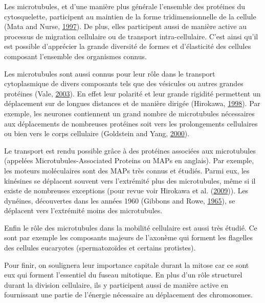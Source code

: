 \documentclass[12pt,a4paper,twoside,openright]{book}
\begin{document}
Les microtubules, et d'une manière plus générale l'ensemble des
protéines du cytosquelette, participent au maintien de la forme
tridimensionnelle de la cellule (Mata and Nurse,
\protect\hyperlink{ref-Mata1997}{1997}). De plus, elles participent
aussi de manière active au processus de migration cellulaire ou de
transport intra-cellulaire. C'est ainsi qu'il est possible d'apprécier
la grande diversité de formes et d'élasticité des cellules composant
l'ensemble des organismes connus.

Les microtubules sont aussi connus pour leur rôle dans le transport
cytoplasmique de divers composants tels que des vésicules ou autres
grandes protéines (Vale, \protect\hyperlink{ref-Vale2003}{2003}). En
effet leur polarité et leur grande rigidité permettent un déplacement
sur de longues distances et de manière dirigée (Hirokawa,
\protect\hyperlink{ref-Hirokawa1998}{1998}). Par exemple, les neurones
contiennent un grand nombre de microtubules nécessaires aux déplacements
de nombreuses protéines soit vers les prolongements cellulaires ou bien
vers le corps cellulaire (Goldstein and Yang,
\protect\hyperlink{ref-Goldstein2000}{2000}).

Le transport est rendu possible grâce à des protéines associées aux
microtubules (appelées Microtubules-Associated Proteins ou MAPs en
anglais). Par exemple, les moteurs moléculaires sont des MAPs très
connus et étudiés. Parmi eux, les kinésines se déplacent souvent vers
l'extrémité plus des microtubules, même si il existe de nombreuses
exceptions (pour revue voir Hirokawa et al.
(\protect\hyperlink{ref-Hirokawa2009}{2009})). Les dynéines, découvertes
dans les années 1960 (Gibbons and Rowe,
\protect\hyperlink{ref-Gibbons1965}{1965}), se déplacent vers
l'extrémité moins des microtubules.

Enfin le rôle des microtubules dans la mobilité cellulaire est aussi
très étudié. Ce sont par exemple les composants majeurs de l'axonème qui
forment les flagelles des cellules eucaryotes (spermatozoïdes et
certains protistes).

Pour finir, on soulignera leur importance capitale durant la mitose car
ce sont eux qui forment l'essentiel du fuseau mitotique. En plus d'un
rôle structurel durant la division cellulaire, ils y participent aussi
de manière active en fournissant une partie de l'énergie nécessaire au
déplacement des chromosomes.
\end{document}
